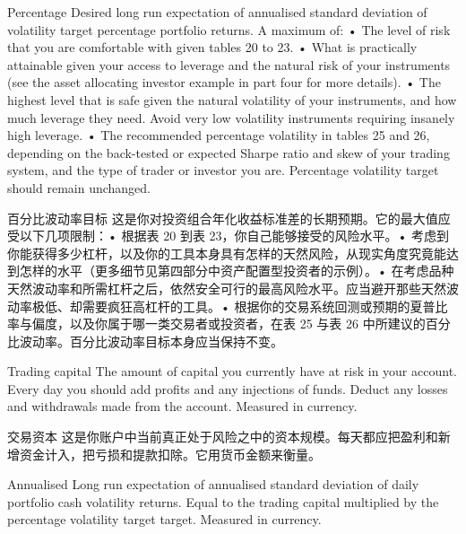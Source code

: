 
\begin{englishblock} Percentage Desired long run expectation of annualised standard deviation of volatility target percentage portfolio returns. A maximum of: • The level of risk that you are comfortable with given tables 20 to 23. • What is practically attainable given your access to leverage and the natural risk of your instruments (see the asset allocating investor example in part four for more details). • The highest level that is safe given the natural volatility of your instruments, and how much leverage they need. Avoid very low volatility instruments requiring insanely high leverage. • The recommended percentage volatility in tables 25 and 26, depending on the back-tested or expected Sharpe ratio and skew of your trading system, and the type of trader or investor you are. Percentage volatility target should remain unchanged. \end{englishblock}

\begin{chineseblock}百分比波动率目标 这是你对投资组合年化收益标准差的长期预期。它的最大值应受以下几项限制：• 根据表 20 到表 23，你自己能够接受的风险水平。• 考虑到你能获得多少杠杆，以及你的工具本身具有怎样的天然风险，从现实角度究竟能达到怎样的水平（更多细节见第四部分中资产配置型投资者的示例）。• 在考虑品种天然波动率和所需杠杆之后，依然安全可行的最高风险水平。应当避开那些天然波动率极低、却需要疯狂高杠杆的工具。• 根据你的交易系统回测或预期的夏普比率与偏度，以及你属于哪一类交易者或投资者，在表 25 与表 26 中所建议的百分比波动率。百分比波动率目标本身应当保持不变。\end{chineseblock}

\bipairgap

\begin{englishblock} Trading capital The amount of capital you currently have at risk in your account. Every day you should add profits and any injections of funds. Deduct any losses and withdrawals made from the account. Measured in currency. \end{englishblock}

\begin{chineseblock}交易资本 这是你账户中当前真正处于风险之中的资本规模。每天都应把盈利和新增资金计入，把亏损和提款扣除。它用货币金额来衡量。\end{chineseblock}

\bipairgap

\begin{englishblock} Annualised Long run expectation of annualised standard deviation of daily portfolio cash volatility returns. Equal to the trading capital multiplied by the percentage volatility target target. Measured in currency. \end{englishblock}

